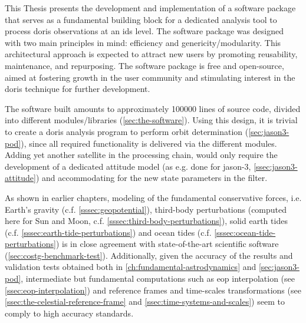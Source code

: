 \iffalse
Within the framework of this Thesis, a software package was designed and implemented from scratch, 
with the aim of acting as a fundamental building block for a state-of-the-art, \gls{ids} 
level, dedicated analysis tool for processing \gls{doris} observations. The design 
principle adopted was twofold, based on efficiency on the one hand and on the same time 
allowing for genericity and modularity. This architectural approach will hopefully 
attract new users, since it favors reusability, maintenance and repurposing. The software 
package is free and open-source, a policy adopted to further aid the growth of the 
user community and in turn boost interest in the technique and thus accommodate further 
developments.
\fi
This Thesis presents the development and implementation of a software package 
that serves as a fundamental building block for a dedicated analysis tool to 
process \gls{doris} observations at an \gls{ids} level. The software package 
was designed with two main principles in mind: efficiency and genericity/modularity. 
This architectural approach is expected to attract new users by promoting 
reusability, maintenance, and repurposing. The software package is free and open-source, 
aimed at fostering growth in the user community and stimulating interest in the 
\gls{doris} technique for further development.

The software built amounts to approximately 100000 lines of source code, divided into 
different modules/libraries (\autoref{sec:the-software}). Using this design, it is 
trivial to create a \gls{doris} analysis program to perform orbit determination 
(\autoref{sec:jason3-pod}), since all required functionality is delivered via the 
different modules. Adding yet another satellite in the processing chain, would only 
require the development of a dedicated attitude model (as e.g. done for \gls{jason}-3, \autoref{ssec:jason3-attitude}) 
and accommodating for the new state parameters in the filter.

As shown in earlier chapters, modeling of the fundamental conservative forces, i.e.
Earth's gravity (c.f. \autoref{sssec:geopotential}), third-body perturbations (computed
here for Sun and Moon, c.f. \autoref{sssec:third-body-perturbations}), solid earth tides
(c.f. \autoref{sssec:earth-tide-perturbations}) and ocean tides (c.f.
\autoref{sssec:ocean-tide-perturbations}) is in close agreement with state-of-the-art
scientific software (\autoref{sec:costg-benchmark-test}). Additionally, given the
accuracy of the results and validation tests obtained both in \autoref{ch:fundamental-astrodynamics}
and \autoref{sec:jason3-pod}, intermediate but fundamental computations such as
\gls{eop} interpolation (see \autoref{ssec:eop-interpolation}) and reference frames and
time-scales transformations (see \autoref{ssec:the-celestial-reference-frame} and
\autoref{ssec:time-systems-and-scales}) seem to comply to high accuracy standards.

